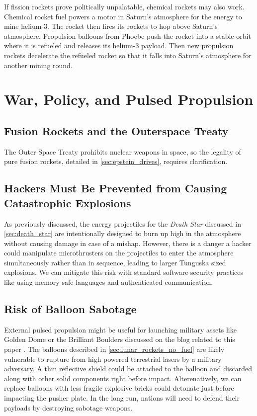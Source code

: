 \documentclass{article}
\begin{document}
If fission rockets prove politically unpalatable, chemical rockets may also work.   Chemical rocket fuel powers a motor in Saturn's atmosphere for the energy to mine helium-3.  The rocket then fires its rockets to hop above Saturn's atmosphere.   Propulsion balloons from Phoebe push the rocket into a stable orbit where it is refueled and releases its helium-3 payload.  Then new propulsion rockets decelerate the refueled rocket so that it falls into Saturn's atmosphere for another mining round.


\section{War, Policy, and Pulsed Propulsion}
\subsection{Fusion Rockets and the Outerspace Treaty}
The Outer Space Treaty \cite{outer_space_treaty} prohibits nuclear weapons in space, so the legality of pure fusion rockets, detailed in \autoref{sec:epstein_drives}, requires clarification.

\subsection{Hackers Must Be Prevented from Causing Catastrophic Explosions}
As previously discussed, the energy projectiles for the \textit{Death Star} discussed in \autoref{sec:death_star} are intentionally designed to burn up high in the atmosphere without causing damage in case of a mishap.  However, there is a danger a hacker could manipulate microthrusters on the projectiles to enter the atmosphere simultaneously rather than in sequence, leading to larger Tunguska \cite{longo2007tunguska} sized explosions.  We can mitigate this risk with standard software security practices like using memory safe languages and authenticated communication.

\subsection{Risk of Balloon Sabotage}
External pulsed propulsion might be useful for launching military assets like Golden Dome \cite{lockheed_martin_golden_dome} or the Brilliant Boulders \cite{brilliant_boulders} discussed on the blog related to this paper \cite{aim2024}.   The balloons described in \autoref{sec:lunar_rockets_no_fuel} are likely vulnerable to rupture from high powered terrestrial lasers by a military adversary.  A thin reflective shield could be attached to the balloon and discarded along with other solid components right before impact.  Alterenatively, we can replace balloons with less fragile explosive bricks could detonate just before impacting the pusher plate. In the long run, nations will need to defend their payloads by destroying sabotage weapons.
\end{document}
